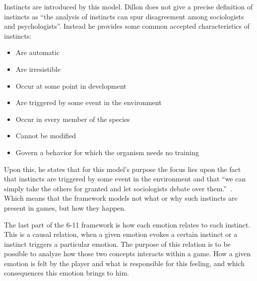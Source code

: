 
Instincts are introduced by this model. Dillon does not give a precise definition of instincts as ``the analysis of instincts can spur disagreement among sociologists and psychologists''\citep{dillon_way_2010}. Instead he provides some common accepted characteristics of instincts:
\begin{itemize}
    \item Are automatic
    \item Are irresistible
    \item Occur at some point in development
    \item Are triggered by some event in the environment
    \item Occur in every member of the species
    \item Cannot be modified
    \item Govern a behavior for which the organism needs no 
training
\end{itemize}


Upon this, he states that for this model's purpose the focus lies upon the fact that instincts are triggered by some event in the environment and that ``we can simply take the others for granted and let sociologists debate over them.''~\citep{dillon_way_2010}. Which means that the framework models not what or why such instincts are present in games, but how they happen.

The last part of the 6-11 framework is how each emotion relates to each instinct. This is a causal relation, when a given emotion evokes a certain instinct or a instinct triggers a particular emotion. The purpose of this relation is to be possible to analyze how those two concepts interacts within a game. How a given emotion is felt by the player and what is responsible for this feeling, and which consequences this emotion brings to him. 

